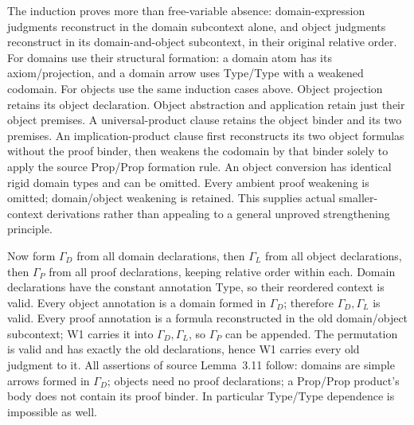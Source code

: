 The induction proves more than free-variable absence: domain-expression
judgments reconstruct in the domain subcontext alone, and object judgments
reconstruct in its domain-and-object subcontext, in their original relative
order. For domains use their structural formation: a domain atom has its
axiom/projection, and a domain arrow uses Type/Type with a weakened codomain.
For objects use the same induction cases above. Object projection retains
its object declaration. Object abstraction and application retain just
their object premises. A universal-product clause retains the object
binder and its two premises. An implication-product clause first reconstructs
its two object formulas without the proof binder, then weakens the
codomain by that binder solely to apply the source Prop/Prop formation
rule. An object conversion has identical rigid domain types and can be
omitted. Every ambient proof weakening is omitted; domain/object weakening
is retained. This supplies actual smaller-context derivations rather
than appealing to a general unproved strengthening principle.

Now form \(\Gamma_D\) from all domain declarations, then
\(\Gamma_L\) from all object declarations, then \(\Gamma_P\) from all
proof declarations, keeping relative order within each. Domain declarations
have the constant annotation Type, so their reordered context is valid.
Every object annotation is a domain formed in \(\Gamma_D\); therefore
\(\Gamma_D,\Gamma_L\) is valid. Every proof annotation is a formula
reconstructed in the old domain/object subcontext; W1 carries it into
\(\Gamma_D,\Gamma_L\), so \(\Gamma_P\) can be appended. The permutation
is valid and has exactly the old declarations, hence W1 carries every
old judgment to it. All assertions of source Lemma~3.11 follow:
domains are simple arrows formed in \(\Gamma_D\); objects need no proof
declarations; a Prop/Prop product's body does not contain its proof binder.
In particular Type/Type dependence is impossible as well.

